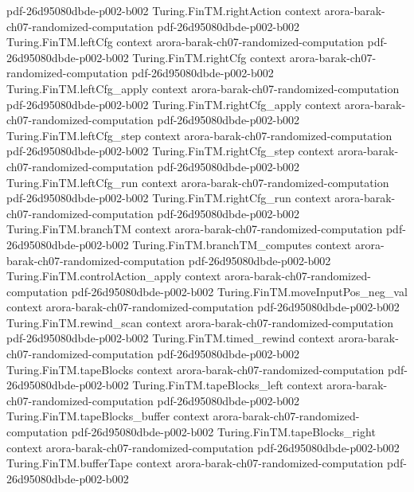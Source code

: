 \begin{theorem}
  {pdf-26d95080dbde-p002-b002}
\proofstep
  {Turing.FinTM.rightAction}
  {context}
  {arora-barak-ch07-randomized-computation}
  {pdf-26d95080dbde-p002-b002}
\proofstep
  {Turing.FinTM.leftCfg}
  {context}
  {arora-barak-ch07-randomized-computation}
  {pdf-26d95080dbde-p002-b002}
\proofstep
  {Turing.FinTM.rightCfg}
  {context}
  {arora-barak-ch07-randomized-computation}
  {pdf-26d95080dbde-p002-b002}
\proofstep
  {Turing.FinTM.leftCfg_apply}
  {context}
  {arora-barak-ch07-randomized-computation}
  {pdf-26d95080dbde-p002-b002}
\proofstep
  {Turing.FinTM.rightCfg_apply}
  {context}
  {arora-barak-ch07-randomized-computation}
  {pdf-26d95080dbde-p002-b002}
\proofstep
  {Turing.FinTM.leftCfg_step}
  {context}
  {arora-barak-ch07-randomized-computation}
  {pdf-26d95080dbde-p002-b002}
\proofstep
  {Turing.FinTM.rightCfg_step}
  {context}
  {arora-barak-ch07-randomized-computation}
  {pdf-26d95080dbde-p002-b002}
\proofstep
  {Turing.FinTM.leftCfg_run}
  {context}
  {arora-barak-ch07-randomized-computation}
  {pdf-26d95080dbde-p002-b002}
\proofstep
  {Turing.FinTM.rightCfg_run}
  {context}
  {arora-barak-ch07-randomized-computation}
  {pdf-26d95080dbde-p002-b002}
\proofstep
  {Turing.FinTM.branchTM}
  {context}
  {arora-barak-ch07-randomized-computation}
  {pdf-26d95080dbde-p002-b002}
\proofstep
  {Turing.FinTM.branchTM_computes}
  {context}
  {arora-barak-ch07-randomized-computation}
  {pdf-26d95080dbde-p002-b002}
\proofstep
  {Turing.FinTM.controlAction_apply}
  {context}
  {arora-barak-ch07-randomized-computation}
  {pdf-26d95080dbde-p002-b002}
\proofstep
  {Turing.FinTM.moveInputPos_neg_val}
  {context}
  {arora-barak-ch07-randomized-computation}
  {pdf-26d95080dbde-p002-b002}
\proofstep
  {Turing.FinTM.rewind_scan}
  {context}
  {arora-barak-ch07-randomized-computation}
  {pdf-26d95080dbde-p002-b002}
\proofstep
  {Turing.FinTM.timed_rewind}
  {context}
  {arora-barak-ch07-randomized-computation}
  {pdf-26d95080dbde-p002-b002}
\proofstep
  {Turing.FinTM.tapeBlocks}
  {context}
  {arora-barak-ch07-randomized-computation}
  {pdf-26d95080dbde-p002-b002}
\proofstep
  {Turing.FinTM.tapeBlocks_left}
  {context}
  {arora-barak-ch07-randomized-computation}
  {pdf-26d95080dbde-p002-b002}
\proofstep
  {Turing.FinTM.tapeBlocks_buffer}
  {context}
  {arora-barak-ch07-randomized-computation}
  {pdf-26d95080dbde-p002-b002}
\proofstep
  {Turing.FinTM.tapeBlocks_right}
  {context}
  {arora-barak-ch07-randomized-computation}
  {pdf-26d95080dbde-p002-b002}
\proofstep
  {Turing.FinTM.bufferTape}
  {context}
  {arora-barak-ch07-randomized-computation}
  {pdf-26d95080dbde-p002-b002}

\end{theorem}
